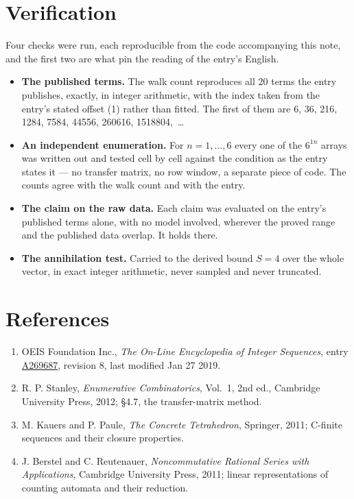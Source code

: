 \documentclass[11pt]{article}
\theoremstyle{definition}
\begin{document}
\section{Verification}

Four checks were run, each reproducible from the code accompanying this note, and the first two are what pin the reading of the entry's English.

\begin{itemize}

\item {\bfseries The published terms.} The walk count reproduces all 20 terms the entry publishes, exactly, in integer arithmetic, with the index taken from the entry's stated offset (1) rather than fitted. The first of them are 6, 36, 216, 1284, 7584, 44556, 260616, 1518804,~\dots

\item {\bfseries An independent enumeration.} For $n = 1,\dots,6$ every one of the $6^{1n}$ arrays was written out and tested cell by cell against the condition as the entry states it --- no transfer matrix, no row window, a separate piece of code. The counts agree with the walk count and with the entry.

\item {\bfseries The claim on the raw data.} Each claim was evaluated on the entry's published terms alone, with no model involved, wherever the proved range and the published data overlap. It holds there.

\item {\bfseries The annihilation test.} Carried to the derived bound $S = 4$ over the whole vector, in exact integer arithmetic, never sampled and never truncated.

\end{itemize}

\section{References}

\begin{enumerate}

\item OEIS Foundation Inc., \emph{The On-Line Encyclopedia of Integer Sequences}, entry \href{https://oeis.org/A269687}{A269687}, revision 8, last modified Jan 27 2019.

\item R. P. Stanley, \emph{Enumerative Combinatorics}, Vol.~1, 2nd ed., Cambridge University Press, 2012; \S4.7, the transfer-matrix method.

\item M. Kauers and P. Paule, \emph{The Concrete Tetrahedron}, Springer, 2011; C-finite sequences and their closure properties.

\item J. Berstel and C. Reutenauer, \emph{Noncommutative Rational Series with Applications}, Cambridge University Press, 2011; linear representations of counting automata and their reduction.

\end{enumerate}
\end{document}
